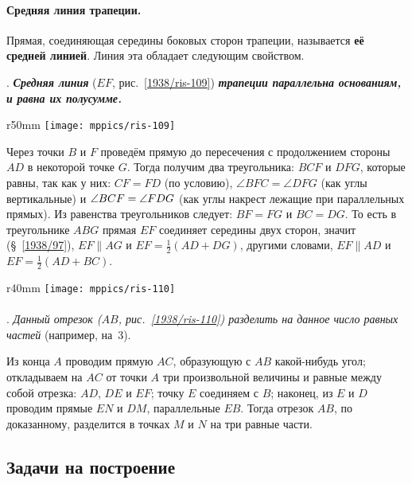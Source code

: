 \paragraph{Средняя линия трапеции.}\label{1938/99}
Прямая, соединяющая середины боковых сторон трапеции, называется \textbf{её средней линией}.
Линия эта обладает следующим свойством.

\smallskip
\mbox{.}
\textbf{\emph{Средняя линия}} ($EF$, рис.~\ref{1938/ris-109}) \textbf{\emph{трапеции параллельна основаниям, и равна их полусумме.}}

\begin{wrapfigure}{r}{50mm}
\vskip-0mm
\centering
\texttt{[image: mppics/ris-109]}
\caption{}\label{1938/ris-109}
\end{wrapfigure}

Через точки $B$ и $F$ проведём прямую до пересечения с продолжением стороны $AD$ в некоторой точке $G$.
Тогда получим два треугольника:
$BCF$ и $DFG$, которые равны, так как у них:
$CF=FD$ (по условию), $\angle BFC=\angle DFG$ (как углы вертикальные) и $\angle BCF \z= \angle FDG$ (как углы накрест лежащие при параллельных прямых).
Из равенства треугольников следует:
$BF=FG$ и $BC=DG$.
То есть в треугольнике $ABG$ прямая $EF$ соединяет середины двух сторон, значит (§~\ref{1938/97}), $EF \parallel AG$ и $EF = \tfrac12(AD+DG)$, другими словами, $EF\parallel AD$ и $EF = \tfrac12(AD + BC)$.

\begin{wrapfigure}[7]{r}{40mm}
\vskip-7mm
\centering
\texttt{[image: mppics/ris-110]}
\caption{}\label{1938/ris-110}
\end{wrapfigure}

\paragraph{}\label{1938/100}
\mbox{.}
\emph{Данный отрезок \emph{($AB$, рис.~\ref{1938/ris-110})} разделить на данное число равных частей} (например, на~3).

Из конца $A$ проводим прямую $AC$, образующую с $AB$ какой-нибудь угол;
откладываем на $AC$ от точки $A$ три произвольной величины и равные между собой отрезка:
$AD$, $DE$ и $EF$;
точку $E$ соединяем с $B$;
наконец, из $E$ и $D$ проводим прямые $EN$ и $DM$, параллельные $EB$.
Тогда отрезок $AB$, по доказанному, разделится в точках $M$ и $N$ на три равные части.

\subsection*{Задачи на построение}


